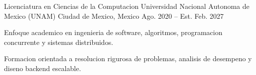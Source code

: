 \begin{cventries}

  \cventry
    {Licenciatura en Ciencias de la Computacion}
    {Universidad Nacional Autonoma de Mexico (UNAM)}
    {Ciudad de Mexico, Mexico}
    {Ago. 2020 -- Est. Feb. 2027}
    {
      \begin{cvitems}
        \item {Enfoque academico en ingenieria de software, algoritmos, programacion concurrente y sistemas distribuidos.}
        \item {Formacion orientada a resolucion rigurosa de problemas, analisis de desempeno y diseno backend escalable.}
      \end{cvitems}
    }

\end{cventries}
